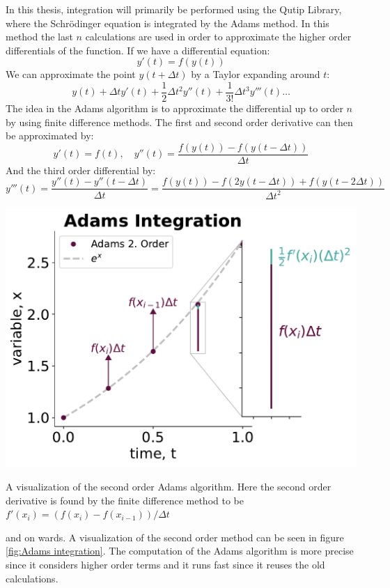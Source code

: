 In this thesis, integration will primarily be performed using the Qutip Library\cite{johansson_qutip_2012}, where the Schrödinger equation is integrated by the Adams method. In this method the last $n$ calculations are used in order to  approximate the higher order differentials of the function. If we have a differential equation:
\begin{equation}
    y'(t) = f(y(t))
\end{equation}
We can approximate the point $y(t+\Delta t)$ by a Taylor expanding around $t$:
\begin{equation}
    y(t) + \Delta t y'(t) + \frac12 \Delta t^2 y''(t) + \frac{1}{3!} \Delta t^3 y'''(t)\dots 
\end{equation}
The idea in the Adams algorithm is to approximate the differential up to order $n$ by using finite difference methods. The first and second order derivative can then be approximated by:
\begin{equation}
    y'(t) = f(t), \quad y''(t) = \frac{f(y(t)) - f(y(t - \Delta t))}{\Delta t} 
\end{equation}
And the third order differential by:
\begin{equation}
    y'''(t) = \frac{y''(t) - y''(t-\Delta t)}{\Delta t} = \frac{f(y(t)) - f(2y(t-\Delta t)) + f(y(t-2\Delta t))}{\Delta t^2}
\end{equation}
\begin{marginfigure}
    \centering
    \includegraphics[width = 1.2 \linewidth]{Figs/Theory/adams_intergation.pdf}
    \caption{A visualization of the second order Adams algorithm. Here the second order derivative is found by the finite difference method to be $f'(x_i) = (f(x_i) - f(x_{i-1}))/\Delta t$}
    \label{fig:Adams integration}
\end{marginfigure}
and on wards. A visualization of the second order method can be seen in figure \ref{fig:Adams integration}. The computation of the Adams algorithm is more precise since it considers higher order terms and it runs fast since it reuses the old calculations. 

